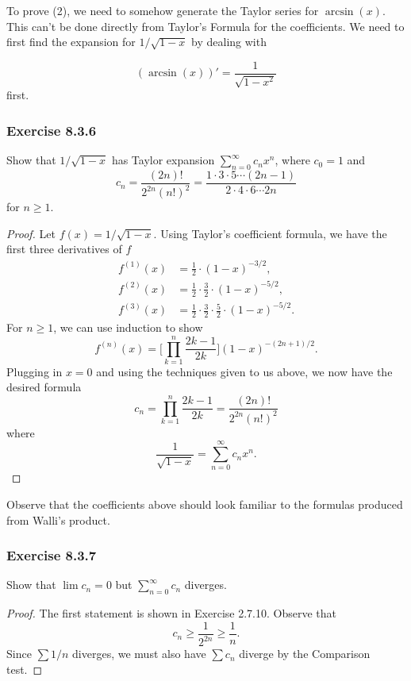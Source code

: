 To prove (2), we need to somehow generate the Taylor series for \( \arcsin(x)  \). This can't be done directly from Taylor's Formula for the coefficients. We need to first find the expansion for \( 1 / \sqrt{ 1 - x  }  \) by dealing with  

\[  (\arcsin(x))' = \frac{ 1 }{ \sqrt{ 1 - x^{2} }  } \] first. 
\subsubsection{Exercise 8.3.6} Show that \( 1 / \sqrt{ 1 - x  }  \) has Taylor expansion \( \sum_{ n=0 }^{ \infty  } c_{n} x^{n}  \), where \( c_{0} = 1  \) and 
\[  c_{n} = \frac{ (2n)!  }{  2^{2n} (n!)^{2}  } = \frac{ 1 \cdot 3 \cdot 5 \dotsb (2n-1) }{ 2 \cdot 4 \cdot 6 \dotsb 2n }  \] for \( n \geq 1  \).
\begin{proof}
Let \( f(x) = 1 / \sqrt{ 1 - x  }  \). Using Taylor's coefficient formula, we have the first three derivatives of \( f  \)
\begin{align*}
    f^{(1)}(x) &= \frac{ 1 }{ 2 } \cdot (1 - x )^{-3/2}, \\
    f^{(2)}(x) &= \frac{ 1  }{ 2 }  \cdot \frac{ 3 }{ 2 } \cdot  (1-x)^{-5/2}, \\
    f^{(3)}(x) &= \frac{ 1 }{ 2 }  \cdot \frac{ 3 }{ 2 }  \cdot \frac{ 5 }{ 2 } \cdot (1- x)^{-5/2}.
\end{align*}
For \( n  \geq 1 \), we can use induction to show  
\[  f^{(n)}(x) =  \Big[ \prod_{k=1}^{n} \frac{ 2k-1 }{ 2k }   \Big] (1 -x )^{-(2n+1)/2}. \] Plugging in \( x = 0  \) and using the techniques given to us above, we now have the desired formula
\[  c_{n} = \prod_{k=1}^{n} \frac{ 2k-1 }{ 2k } = \frac{ (2n)!  }{ 2^{2n}  (n!)^2   }  \] 
where 
\[  \frac{ 1 }{ \sqrt{ 1-x  }  }  = \sum_{ n=0 }^{ \infty  } c_{n} x^{n}. \]

\end{proof}

Observe that the coefficients above should look familiar to the formulas produced from Walli's product.

\subsubsection{Exercise 8.3.7} Show that \( \lim c_{n} =  0  \) but \( \sum_{ n=0  }^{ \infty  } c_{n}  \) diverges.
\begin{proof}
The first statement is shown in Exercise 2.7.10. Observe that 
\[  c_{n} \geq \frac{ 1 }{ 2^{2n} } \geq \frac{ 1 }{ n }. \] Since \( \sum 1 / n  \) diverges, we must also have \( \sum c_{n}   \) diverge by the Comparison test. 
\end{proof}

